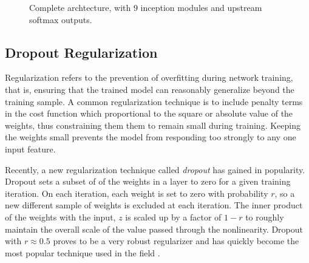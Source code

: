 \begin{figure}[t]
\begin{center}
  \end{center}
  \caption[Complete \googlenet architecture]{Complete \googlenet archtecture, with 9 inception modules and upstream softmax outputs.}
  \label{googlenet}
\end{figure}

\subsection{Dropout Regularization}

Regularization refers to the prevention of overfitting during network training, that is, ensuring that the trained model can reasonably generalize beyond the training sample.
A common regularization technique is to include penalty terms in the cost function which proportional to the square or absolute value of the weights, thus constraining them them to remain small during training.
Keeping the weights small prevents the model from responding too strongly to any one input feature.

Recently, a new regularization technique called \textit{dropout} \cite{hinton2014dropout} has gained in popularity.
Dropout sets a subset of of the weights in a layer to zero for a given training iteration.  On each iteration, each weight is set to zero with probability $r$, so a new different sample of weights is excluded at each iteration.
The inner product of the weights with the input, $z$ is scaled up by a factor of $1-r$ to roughly maintain the overall scale of the value passed through the nonlinearity.
Dropout with $r\approx 0.5$ proves to be a very robust regularizer and has quickly become the most popular technique used in the field \cite{lecun2015deep}.


